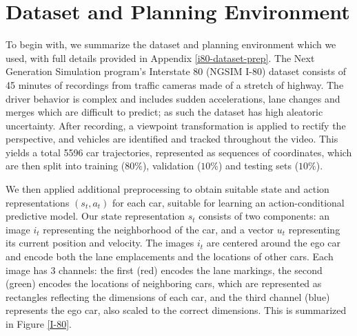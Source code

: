 \documentclass{article} %
\begin{document}
\section{Dataset and Planning Environment}

To begin with, we summarize the dataset and planning environment which we used, with full details provided in Appendix \ref{i80-dataset-prep}. 
The Next Generation Simulation program's Interstate 80 (NGSIM I-80) dataset \citep{NGSIM} consists of 45 minutes of recordings from traffic cameras made of a stretch of highway.
The driver behavior is complex and includes sudden accelerations, lane changes and merges which are difficult to predict; as such the dataset has high aleatoric uncertainty.
After recording, a viewpoint transformation is applied to rectify the perspective, and vehicles are identified and tracked throughout the video.
This yields a total 5596 car trajectories, represented as sequences of coordinates, which are then split into training ($80\%$), validation ($10\%$) and testing sets ($10\%$).

We then applied additional preprocessing to obtain suitable state and action representations $(s_t, a_t)$ for each car, suitable for learning an action-conditional predictive model.
Our state representation $s_t$ consists of two components: an image $i_t$ representing the neighborhood of the car, and a vector $u_t$ representing its current position and velocity.
The images $i_t$ are centered around the ego car and encode both the lane emplacements and the locations of other cars.
Each image has 3 channels: the first (red) encodes the lane markings, the second (green) encodes the locations of neighboring cars, which are represented as rectangles reflecting the dimensions of each car, and the third channel (blue) represents the ego car, also scaled to the correct dimensions.
This is summarized in Figure \ref{I-80}.
\end{document}
